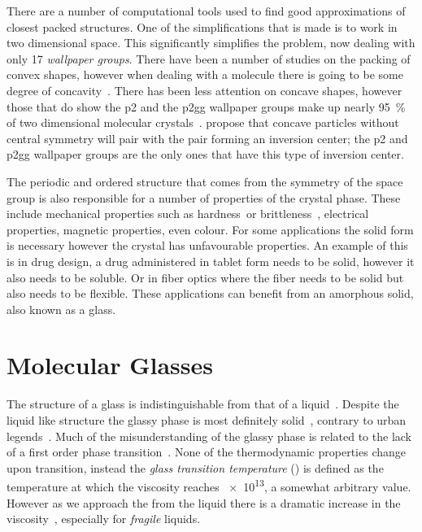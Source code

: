 There are a number of computational tools used to find good approximations of closest packed structures\tocite. One of the simplifications that is made is to work in two dimensional space. This significantly simplifies the problem, now dealing with only 17 \emph{wallpaper groups}\figref{}. There have been a number of studies on the packing of convex shapes, however when dealing with a molecule there is going to be some degree of concavity~\figref{}. There has been less attention on concave shapes, however those that do show the p2 and the p2gg wallpaper groups make up nearly \SI{95}{\percent} of two dimensional molecular crystals~\tocite. \textcite{torquato:12} propose that concave particles without central symmetry will pair with the pair forming an inversion center; the p2 and p2gg wallpaper groups are the only ones that have this type of inversion center. 

The periodic and ordered structure that comes from the symmetry of the space group is also responsible for a number of properties of the crystal phase. These include mechanical properties such as hardness~\tocite or brittleness~\tocite, electrical properties\tocite, magnetic properties\tocite, even colour\tocite. For some applications the solid form is necessary however the crystal has unfavourable properties. An example of this is in drug design, a drug administered in tablet form needs to be solid, however it also needs to be soluble\tocite. Or in fiber optics where the fiber needs to be solid but also needs to be flexible\tocite. These applications can benefit from an amorphous solid, also known as a glass.

\section{Molecular Glasses}

The structure of a glass is indistinguishable from that of a liquid~\figref{}. Despite the liquid like structure the glassy phase is most definitely solid~\tocite, contrary to urban legends~\tocite. Much of the misunderstanding of the glassy phase is related to the lack of a first order phase transition~\tocite. None of the thermodynamic properties change upon transition, instead the \emph{glass transition temperature} (\si{\Tg}) is defined as the temperature at which the viscosity reaches \SI{e13}{\poise}, a somewhat arbitrary value. However as we approach the \si{\Tg} from the liquid there is a dramatic increase in the viscosity~\figref{}, especially for \emph{fragile} liquids.

